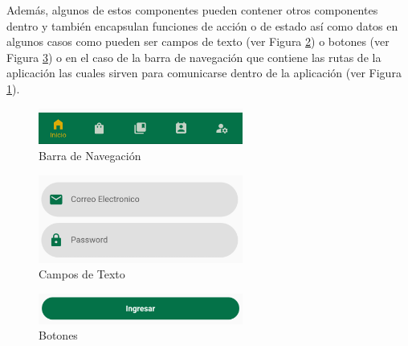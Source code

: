 \documentclass[runningheads]{llncs}
\begin{document}
                Además, algunos de estos componentes pueden contener otros componentes dentro y también encapsulan funciones de acción o de estado así como datos en algunos casos como pueden ser campos de texto (ver Figura \ref{fig10}) o botones (ver Figura \ref{fig11}) o en el caso de la barra de navegación que contiene las rutas de la aplicación las cuales sirven para comunicarse dentro de la aplicación (ver Figura \ref{fig9}).

                \begin{figure}[H]
                    \centering\captionsetup{width=0.8\textwidth}
                    \includegraphics[width=0.6\textwidth]{figures/graphic_components/barra_navegacion.png}
                    \caption{Barra de Navegación} \label{fig9}
                    \end{figure}
                \begin{figure}[H]
                    \centering\captionsetup{width=0.8\textwidth}
                    \includegraphics[width=0.6\textwidth]{figures/graphic_components/text_fields.png}
                    \caption{Campos de Texto} \label{fig10}
                \end{figure}
                \begin{figure}[H]
                    \centering\captionsetup{width=0.8\textwidth}
                    \includegraphics[width=0.6\textwidth]{figures/graphic_components/button.png}
                    \caption{Botones} \label{fig11}
                \end{figure}
\end{document}
